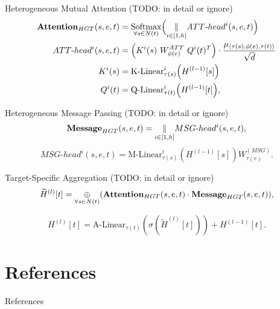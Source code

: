 \documentclass[aspectratio=1610,xcolor={dvipsnames},hyperref={colorlinks,unicode,linkcolor=violet,anchorcolor=blueviolet,citecolor=YellowOrange,filecolor=black,urlcolor=Aquamarine}]{beamer}
\begin{document}
\begin{frame}[label={sec:org873a77d}]{Heterogeneous Mutual Attention (TODO: in detail or ignore)}
\begin{align}
{\bf Attention}_{HGT}(s,e,t)& = \underset{\forall s \in N(t)}{\text{Softmax}}\Big (\underset{i \in [1,h]}{{\mathbin \Vert }}ATT\text{-}head^{i}(s,e,t)\Big)\\
ATT\text{-}head^{i}(s,e,t)& = \Big (K^i(s)\ W^{ATT}_{\phi (e)}\ Q^i(t)^T\Big) \cdot \frac{{\mu }_{\langle \tau (s), \phi (e), \tau (t) \rangle }}{\sqrt {d}} \nonumber \\
K^i(s)& = \text{K-Linear}^i_{\tau (s)}\Big ({H}^{(l-1)}[s]\Big) \nonumber \\
Q^i(t)& = \text{Q-Linear}^i_{\tau (t)}\Big (H^{(l-1)}[t]\Big) \nonumber,
\end{align}
\end{frame}

\begin{frame}[label={sec:orgf058dfc}]{Heterogeneous Message Passing (TODO: in detail or ignore)}
\begin{equation}{\bf Message}_{HGT} (s, e, t) = \underset{i \in [1,h]}{{\mathbin \Vert }} MSG\text{-}head^i (s, e, t), \end{equation}
\begin{equation}MSG\text{-}head^i (s, e, t) = \text{M-Linear}^i _{\tau (s)} (H^{(l - 1)}
[s])W^{(MSG)} _{\tau(e)}.\end{equation}
\end{frame}

\begin{frame}[label={sec:org1c0c3f5}]{Target-Specific Aggregation (TODO: in detail or ignore)}
\begin{equation}\widetilde H^{(l)} [t] = \underset{\forall s \in N(t)} \oplus
({\bf Attention}_{HGT} (s, e, t) \cdot {\bf Message}_{HGT} (s, e, t)), \end{equation}

\begin{equation} H^{(l)} [t] = \text{A-Linear} _{\tau(t)} (\sigma(\widetilde H
^{(l)} [t])) + H^{(l - 1)} [t].\end{equation}
\end{frame}

\section{References}
\label{sec:org5c7a39c}

\begin{frame}[allowframebreaks]{References}
\printbibliography[heading=none]
\end{frame}
\end{document}

